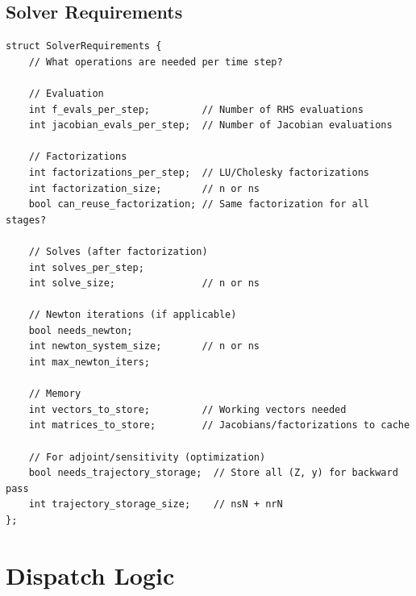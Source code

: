 \documentclass[11pt]{article}
\begin{document}
\subsection{Solver Requirements}

\begin{verbatim}
struct SolverRequirements {
    // What operations are needed per time step?
    
    // Evaluation
    int f_evals_per_step;         // Number of RHS evaluations
    int jacobian_evals_per_step;  // Number of Jacobian evaluations
    
    // Factorizations
    int factorizations_per_step;  // LU/Cholesky factorizations
    int factorization_size;       // n or ns
    bool can_reuse_factorization; // Same factorization for all stages?
    
    // Solves (after factorization)
    int solves_per_step;
    int solve_size;               // n or ns
    
    // Newton iterations (if applicable)
    bool needs_newton;
    int newton_system_size;       // n or ns
    int max_newton_iters;
    
    // Memory
    int vectors_to_store;         // Working vectors needed
    int matrices_to_store;        // Jacobians/factorizations to cache
    
    // For adjoint/sensitivity (optimization)
    bool needs_trajectory_storage;  // Store all (Z, y) for backward pass
    int trajectory_storage_size;    // nsN + nrN
};
\end{verbatim}

\section{Dispatch Logic}
\end{document}
